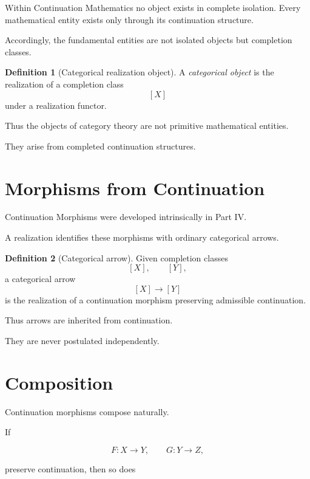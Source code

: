 \documentclass[13pt,openany]{book}
\theoremstyle{plain}
\theoremstyle{definition}
\newtheorem{definition}{Definition}[chapter]
\begin{document}
Within Continuation Mathematics no object exists in complete isolation.
Every mathematical entity exists only through its continuation structure.

Accordingly, the fundamental entities are not isolated objects but completion
classes.

\begin{definition}[Categorical realization object]
A \emph{categorical object} is the realization of a completion class
\[
[X]
\]
under a realization functor.
\end{definition}

Thus the objects of category theory are not primitive mathematical entities.

They arise from completed continuation structures.

\section{Morphisms from Continuation}

Continuation Morphisms were developed intrinsically in Part IV.

A realization identifies these morphisms with ordinary categorical arrows.

\begin{definition}[Categorical arrow]
Given completion classes
\[
[X],\qquad[Y],
\]
a categorical arrow
\[
[X]\longrightarrow[Y]
\]
is the realization of a continuation morphism preserving admissible
continuation.
\end{definition}

Thus arrows are inherited from continuation.

They are never postulated independently.

\section{Composition}

Continuation morphisms compose naturally.

If

\[
F:X\rightarrow Y,
\qquad
G:Y\rightarrow Z,
\]

preserve continuation, then so does
\end{document}
